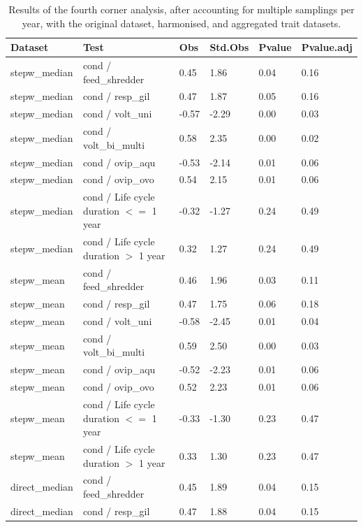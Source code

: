 \documentclass[12pt]{article}
\begin{document}
\begin{longtable}[H]{m{2.6cm}|m{7.3cm}|m{1cm}|m{1.4cm}|m{1.5cm}|m{1.5cm}}
    \caption{Results of the fourth corner analysis, after accounting for multiple samplings per year, with the original dataset, harmonised, and aggregated trait datasets.}
    \label{stab:fc_selected_reduced}
    \endfirsthead
    \toprule[.1em]
    Dataset & Test & Obs & Std.Obs & Pvalue & Pvalue.adj \\ 
    \toprule[.1em]
       stepw\_median & cond / feed\_shredder & 0.45 & 1.86  & 0.04 & 0.16 \\ 
       stepw\_median & cond / resp\_gil & 0.47 & 1.87  & 0.05 & 0.16 \\ 
       stepw\_median & cond / volt\_uni & -0.57 & -2.29  & 0.00 & 0.03 \\ 
       stepw\_median & cond / volt\_bi\_multi & 0.58 & 2.35  & 0.00 & 0.02 \\ 
       stepw\_median & cond / ovip\_aqu & -0.53 & -2.14  & 0.01 & 0.06 \\ 
       stepw\_median & cond / ovip\_ovo & 0.54 & 2.15  & 0.01 & 0.06 \\ 
       stepw\_median & cond / Life cycle duration $<=$ 1 year & -0.32 & -1.27  & 0.24 & 0.49 \\ 
       stepw\_median & cond / Life cycle duration $>$ 1 year & 0.32 & 1.27  & 0.24 & 0.49 \\ 
       stepw\_mean & cond / feed\_shredder & 0.46 & 1.96  & 0.03 & 0.11 \\ 
       stepw\_mean & cond / resp\_gil & 0.47 & 1.75  & 0.06 & 0.18 \\ 
       stepw\_mean & cond / volt\_uni & -0.58 & -2.45  & 0.01 & 0.04 \\ 
       stepw\_mean & cond / volt\_bi\_multi & 0.59 & 2.50  & 0.00 & 0.03 \\ 
       stepw\_mean & cond / ovip\_aqu & -0.52 & -2.23  & 0.01 & 0.06 \\ 
       stepw\_mean & cond / ovip\_ovo & 0.52 & 2.23  & 0.01 & 0.06 \\ 
       stepw\_mean & cond / Life cycle duration $<=$ 1 year & -0.33 & -1.30  & 0.23 & 0.47 \\ 
       stepw\_mean & cond / Life cycle duration $>$ 1 year & 0.33 & 1.30  & 0.23 & 0.47 \\ 
       direct\_median & cond / feed\_shredder & 0.45 & 1.89  & 0.04 & 0.15 \\ 
       direct\_median & cond / resp\_gil & 0.47 & 1.88  & 0.04 & 0.15 \\ 

\end{longtable}
\end{document}

